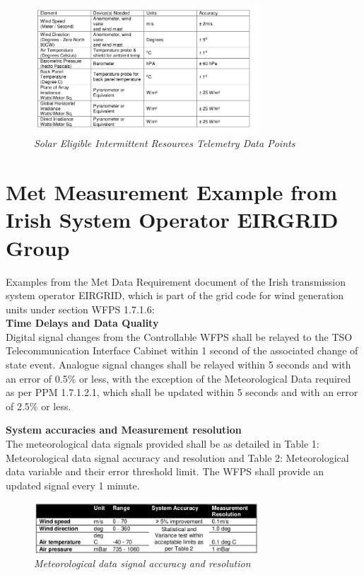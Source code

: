 \begin{figure}[h!]
\includegraphics[width=0.75\textwidth]{figures/CAISO_tableQ3.png}
\caption{\textit{Solar Eligible Intermittent Resources Telemetry Data Points}} 
\label{fig:CAISO_tableQ3}
\end{figure}


\section{Met Measurement Example from Irish System Operator EIRGRID Group}

Examples from the Met Data Requirement document of the Irish transmission system operator EIRGRID, which is part of the grid code for wind generation units  under section WFPS 1.7.1.6: \\

\textbf{Time Delays and Data Quality}\\
Digital signal changes from the Controllable WFPS shall be relayed to the TSO
Telecommunication Interface Cabinet within 1 second of the associated change of
state event. Analogue signal changes shall be relayed within 5 seconds and with an error
of 0.5\% or less, with the exception of the Meteorological Data required as per PPM
1.7.1.2.1, which shall be updated within 5 seconds and with an error of 2.5\% or less.


\textbf{System accuracies and Measurement resolution}\\
The meteorological data signals provided shall be as detailed in Table 1: Meteorological data signal
accuracy and resolution and Table 2: Meteorological data variable and their error threshold limit. The WFPS shall provide an updated signal every 1 minute.

\begin{figure}[h!]
\includegraphics[width=0.75\textwidth]{figures/EIRGRID_table1.png}
\caption{\textit{Meteorological data signal accuracy and resolution}} 
\label{fig:EIRGRID_table1}
\end{figure}

